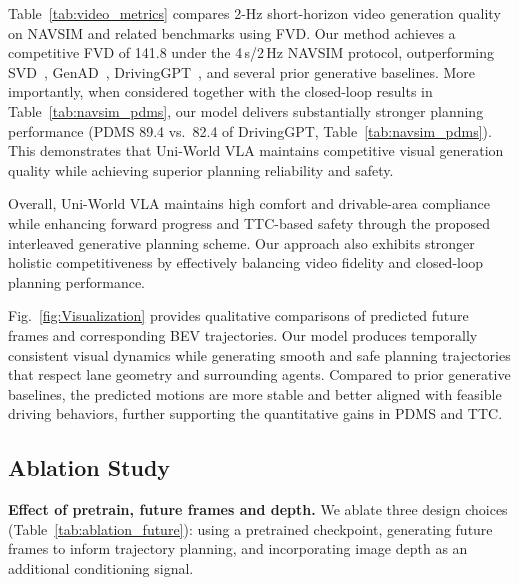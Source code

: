 \documentclass[runningheads]{llncs}
\begin{document}
Table~\ref{tab:video_metrics} compares 2-Hz short-horizon video generation quality on NAVSIM and related benchmarks using FVD. 
Our method achieves a competitive FVD of 141.8 under the 4\,s/2\,Hz NAVSIM protocol, 
outperforming SVD~\cite{blattmann2023stablevideodiffusion,chen2024drivinggpt}, GenAD~\cite{yang2024genadgeneralizedpredictivemodel}, DrivingGPT~\cite{chen2024drivinggpt}, and several prior generative baselines.
More importantly, when considered together with the closed-loop results in Table~\ref{tab:navsim_pdms}, our model delivers substantially stronger planning performance (PDMS 89.4 vs.\ 82.4 of DrivingGPT, Table~\ref{tab:navsim_pdms}). 
This demonstrates that Uni-World VLA maintains competitive visual generation quality while achieving superior planning reliability and safety. 

Overall, Uni-World VLA maintains high comfort and drivable-area compliance while enhancing forward progress and TTC-based safety through the proposed interleaved generative planning scheme. Our approach also exhibits stronger holistic competitiveness by effectively balancing video fidelity and closed-loop planning performance.

Fig.~\ref{fig:Visualization} provides qualitative comparisons of predicted future frames and corresponding BEV trajectories. 
Our model produces temporally consistent visual dynamics while generating smooth and safe planning trajectories that respect lane geometry and surrounding agents. 
Compared to prior generative baselines, the predicted motions are more stable and better aligned with feasible driving behaviors, further supporting the quantitative gains in PDMS and TTC.

\subsection{Ablation Study}

\noindent\textbf{Effect of pretrain, future frames and depth.}
We ablate three design choices (Table~\ref{tab:ablation_future}): using a pretrained checkpoint, generating future frames to inform trajectory planning, and incorporating image depth as an additional conditioning signal.
\end{document}
